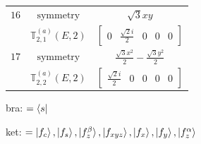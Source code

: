 \documentclass[fleqn,8pt,landscape]{jsarticle}
\begin{document}
\begin{longtable}{ccc}
$ 16 $ & $ \text{symmetry} $ & $ \sqrt{3} x y $ \\
$  $ & $ \mathbb{T}_{2,1}^{(a)}(E,2) $ & $ \begin{bmatrix} 0 & \frac{\sqrt{2} i}{2} & 0 & 0 & 0 \end{bmatrix} $ \\ \hline
$ 17 $ & $ \text{symmetry} $ & $ \frac{\sqrt{3} x^{2}}{2} - \frac{\sqrt{3} y^{2}}{2} $ \\
$  $ & $ \mathbb{T}_{2,2}^{(a)}(E,2) $ & $ \begin{bmatrix} \frac{\sqrt{2} i}{2} & 0 & 0 & 0 & 0 \end{bmatrix} $ \\ \hline
\end{longtable}
bra: $=\bra{s}$

\noindent
ket: $=\ket{f_{c}}, \ket{f_{s}}, \ket{f_{z}^{\beta}}, \ket{f_{xyz}}, \ket{f_{x}}, \ket{f_{y}}, \ket{f_{z}^{\alpha}}$
\renewcommand{\arraystretch}{1.6}
\end{document}
